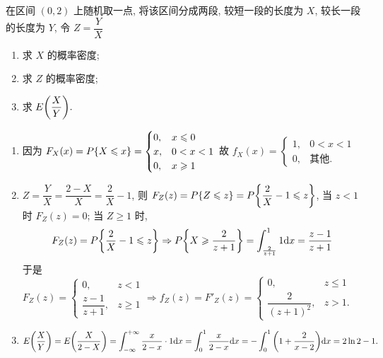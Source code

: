 \begin{example}[2019 数一]
    在区间 $(0,2)$ 上随机取一点, 将该区间分成两段, 较短一段的长度为 $X$, 较长一段的长度为 $Y$, 令 $Z=\dfrac{Y}{X}$
    \begin{enumerate}[label=(\arabic{*})]
        \item 求 $X$ 的概率密度;
        \item 求 $Z$ 的概率密度;
        \item 求 $E\qty(\dfrac{X}{Y}).$
    \end{enumerate}
\end{example}
\begin{solution}
    \begin{enumerate}[label=(\arabic{*})]
        \item 因为 $F_X(x)=P\qty{X\leqslant x}=\begin{cases}
                      0, & x\leqslant 0 \\
                      x, & 0<x<1        \\
                      0, & x\geqslant 1
                  \end{cases}$ 故 $f_X(x)=\begin{cases}
                      1, & 0<x<1        \\
                      0, & \text{其他}.
                  \end{cases}$
        \item $Z=\dfrac{Y}{X}=\dfrac{2-X}{X}=\dfrac{2}{X}-1$, 则 $F_Z(z)=P\qty{Z\leqslant z}=P\qty{\dfrac{2}{X}-1\leqslant z}$, 
              当 $z<1$ 时 $F_Z(z)=0$; 当 $Z\geqslant 1$ 时, $$F_Z(z)=P\qty{\dfrac{2}{X}-1\leqslant z}\Rightarrow P\qty{X\geqslant \dfrac{2}{z+1}}=\int_{\frac{2}{z+1}}^{1}1\dd x=\dfrac{z-1}{z+1}$$
              于是 $F_Z(z)=\begin{cases}
                      0,                & z<1          \\
                      \dfrac{z-1}{z+1}, & z\geqslant 1
                  \end{cases}\Rightarrow f_Z(z)=F'_Z(z)=\begin{cases}
                      0,                  & z\leqslant 1 \\
                      \dfrac{2}{(z+1)^2}, & z> 1.
                  \end{cases}$
        \item $E\qty(\dfrac{X}{Y})=E\qty(\dfrac{X}{2-X})=\displaystyle\int_{-\infty}^{+\infty}\dfrac{x}{2-x}\cdot1\dd x=\int_{0}^{1}\dfrac{x}{2-x}\dd x=-\int_{0}^{1}\qty(1+\dfrac{2}{x-2})\dd x=2\ln 2-1.$
    \end{enumerate}
\end{solution}

